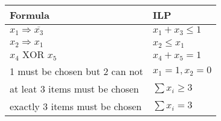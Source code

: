 \documentclass[
  czech,
  a4paperpaper,
]{article}
\begin{document}
\begin{longtable}[]{@{}ll@{}}
\toprule
\begin{minipage}[b]{0.46\columnwidth}\raggedright
Formula\strut
\end{minipage} & \begin{minipage}[b]{0.48\columnwidth}\raggedright
ILP\strut
\end{minipage}\tabularnewline
\midrule
\endhead
\begin{minipage}[t]{0.46\columnwidth}\raggedright
\(x_1 \Rightarrow \overline{x_3}\)\strut
\end{minipage} & \begin{minipage}[t]{0.48\columnwidth}\raggedright
\(x_1 + x_3 \leq 1\)\strut
\end{minipage}\tabularnewline
\begin{minipage}[t]{0.46\columnwidth}\raggedright
\(x_2 \Rightarrow x_1\)\strut
\end{minipage} & \begin{minipage}[t]{0.48\columnwidth}\raggedright
\(x_2 \leq x_1\)\strut
\end{minipage}\tabularnewline
\begin{minipage}[t]{0.46\columnwidth}\raggedright
\(x_4 \text{ XOR } x_5\)\strut
\end{minipage} & \begin{minipage}[t]{0.48\columnwidth}\raggedright
\(x_4 + x_5 = 1\)\strut
\end{minipage}\tabularnewline
\begin{minipage}[t]{0.46\columnwidth}\raggedright
1 must be chosen but 2 can not\strut
\end{minipage} & \begin{minipage}[t]{0.48\columnwidth}\raggedright
\(x_1 = 1, x_2 = 0\)\strut
\end{minipage}\tabularnewline
\begin{minipage}[t]{0.46\columnwidth}\raggedright
at leat 3 items must be chosen\strut
\end{minipage} & \begin{minipage}[t]{0.48\columnwidth}\raggedright
\(\sum x_i \geq 3\)\strut
\end{minipage}\tabularnewline
\begin{minipage}[t]{0.46\columnwidth}\raggedright
exactly 3 items must be chosen\strut
\end{minipage} & \begin{minipage}[t]{0.48\columnwidth}\raggedright
\(\sum x_i = 3\)\strut
\end{minipage}\tabularnewline

\end{longtable}
\end{document}
